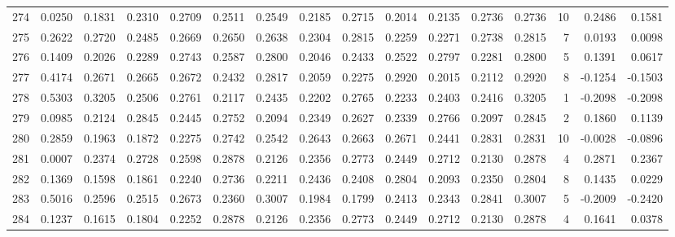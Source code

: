 \begin{tabular}{lrrrrrrrrrrrrrrr}
274 &      0.0250 &  0.1831 &  0.2310 &  0.2709 &  0.2511 &  0.2549 &  0.2185 &  0.2715 &  0.2014 &  0.2135 &   0.2736 &     0.2736 &     10 &                    0.2486 &                     0.1581 \\
275 &      0.2622 &  0.2720 &  0.2485 &  0.2669 &  0.2650 &  0.2638 &  0.2304 &  0.2815 &  0.2259 &  0.2271 &   0.2738 &     0.2815 &      7 &                    0.0193 &                     0.0098 \\
276 &      0.1409 &  0.2026 &  0.2289 &  0.2743 &  0.2587 &  0.2800 &  0.2046 &  0.2433 &  0.2522 &  0.2797 &   0.2281 &     0.2800 &      5 &                    0.1391 &                     0.0617 \\
277 &      0.4174 &  0.2671 &  0.2665 &  0.2672 &  0.2432 &  0.2817 &  0.2059 &  0.2275 &  0.2920 &  0.2015 &   0.2112 &     0.2920 &      8 &                   -0.1254 &                    -0.1503 \\
278 &      0.5303 &  0.3205 &  0.2506 &  0.2761 &  0.2117 &  0.2435 &  0.2202 &  0.2765 &  0.2233 &  0.2403 &   0.2416 &     0.3205 &      1 &                   -0.2098 &                    -0.2098 \\
279 &      0.0985 &  0.2124 &  0.2845 &  0.2445 &  0.2752 &  0.2094 &  0.2349 &  0.2627 &  0.2339 &  0.2766 &   0.2097 &     0.2845 &      2 &                    0.1860 &                     0.1139 \\
280 &      0.2859 &  0.1963 &  0.1872 &  0.2275 &  0.2742 &  0.2542 &  0.2643 &  0.2663 &  0.2671 &  0.2441 &   0.2831 &     0.2831 &     10 &                   -0.0028 &                    -0.0896 \\
281 &      0.0007 &  0.2374 &  0.2728 &  0.2598 &  0.2878 &  0.2126 &  0.2356 &  0.2773 &  0.2449 &  0.2712 &   0.2130 &     0.2878 &      4 &                    0.2871 &                     0.2367 \\
282 &      0.1369 &  0.1598 &  0.1861 &  0.2240 &  0.2736 &  0.2211 &  0.2436 &  0.2408 &  0.2804 &  0.2093 &   0.2350 &     0.2804 &      8 &                    0.1435 &                     0.0229 \\
283 &      0.5016 &  0.2596 &  0.2515 &  0.2673 &  0.2360 &  0.3007 &  0.1984 &  0.1799 &  0.2413 &  0.2343 &   0.2841 &     0.3007 &      5 &                   -0.2009 &                    -0.2420 \\
284 &      0.1237 &  0.1615 &  0.1804 &  0.2252 &  0.2878 &  0.2126 &  0.2356 &  0.2773 &  0.2449 &  0.2712 &   0.2130 &     0.2878 &      4 &                    0.1641 &                     0.0378 \\

\end{tabular}
